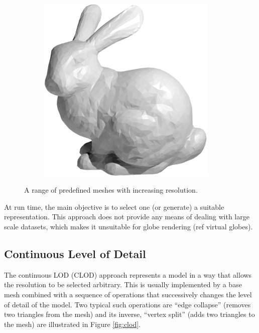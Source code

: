\begin{figure}
\begin{subfigure}[b]{0.2\textwidth}
    \end{subfigure}
    ~ %
    \begin{subfigure}[b]{0.2\textwidth}
        \includegraphics[width=\textwidth]{figures/lod/decimation1.png}
    \end{subfigure}
    \caption{A range of predefined meshes with increasing resolution.}
    \label{fig:dlod}
\end{figure}

At run time, the main objective is to select one (or generate) a suitable representation. This approach does not provide any means of dealing with large scale datasets, which makes it unsuitable for globe rendering (ref virtual globes).


\subsection{Continuous Level of Detail}
The continuous LOD (CLOD) approach represents a model in a way that allows the resolution to be selected arbitrary. This is usually implemented by a base mesh combined with a sequence of operations that successively changes the level of detail of the model. Two typical such operations are ``edge collapse'' (removes two triangles from the mesh) and its inverse, ``vertex split'' (adds two triangles to the mesh) are illustrated in Figure \ref{fig:clod}.

